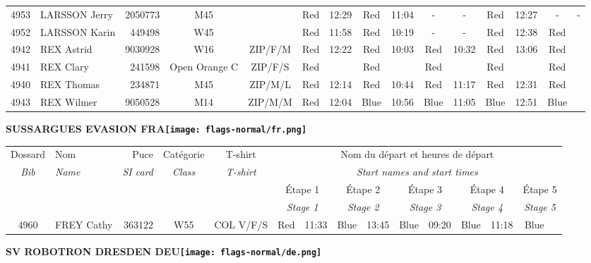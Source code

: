 \documentclass{report}
\begin{document}
\begin{longtable}{|c|l|r|c|c|*{5}{cc|}}
    4953 & LARSSON Jerry & 2050773 & M45 &   & Red & 12:29 & Red & 11:04 & - &  - & Red & 12:27 & - &  -\\
    4952 & LARSSON Karin & 449498 & W45 &   & Red & 11:58 & Red & 10:19 & - &  - & Red & 12:38 & Red &  \\
    4942 & REX Astrid & 9030928 & W16 & ZIP/F/M & Red & 12:22 & Red & 10:03 & Red & 10:32 & Red & 13:06 & Red &  \\
    4941 & REX Clary & 241598 & Open Orange C & ZIP/F/S & Red &   & Red &   & Red &   & Red &   & Red &  \\
    4940 & REX Thomas & 234871 & M45 & ZIP/M/L & Red & 12:14 & Red & 10:44 & Red & 11:17 & Red & 12:31 & Red &  \\
    4943 & REX Wilmer & 9050528 & M14 & ZIP/M/M & Red & 12:04 & Blue & 10:56 & Blue & 11:05 & Blue & 12:51 & Blue &  \\
  \end{longtable}
\newpage
  \Huge \centering \bfseries SUSSARGUES EVASION  FRA\normalfont \footnotesize \sffamily \hfill \texttt{[image: flags-normal/fr.png]} \newline 
  \begin{longtable}{|c|l|r|c|c|*{5}{cc|}}
    Dossard & Nom  & Puce    & Catégorie & T-shirt & \multicolumn{10}{c|}{Nom du départ et heures de départ} \\
    \itshape Bib     & \itshape Name & \itshape SI card & \itshape Class  & \itshape  T-shirt  & \multicolumn{10}{c|}{\itshape Start names and start times} \\
    \hline
    & & & & & \multicolumn{2}{c|}{Étape 1} & \multicolumn{2}{c|}{Étape 2} & \multicolumn{2}{c|}{Étape 3} & \multicolumn{2}{c|}{Étape 4} & \multicolumn{2}{c|}{Étape 5} \\
    & & & & & \multicolumn{2}{c|}{\itshape Stage 1} & \multicolumn{2}{c|}{\itshape Stage 2} & \multicolumn{2}{c|}{\itshape Stage 3} & \multicolumn{2}{c|}{\itshape Stage 4} & \multicolumn{2}{c|}{\itshape Stage 5} \\
    \hline
    4960 & FREY Cathy & 363122 & W55 & COL V/F/S & Red & 11:33 & Blue & 13:45 & Blue & 09:20 & Blue & 11:18 & Blue &  \\
  \end{longtable}
\newpage
  \Huge \centering \bfseries SV ROBOTRON DRESDEN  DEU\normalfont \footnotesize \sffamily \hfill \texttt{[image: flags-normal/de.png]} \newline 
\end{document}
